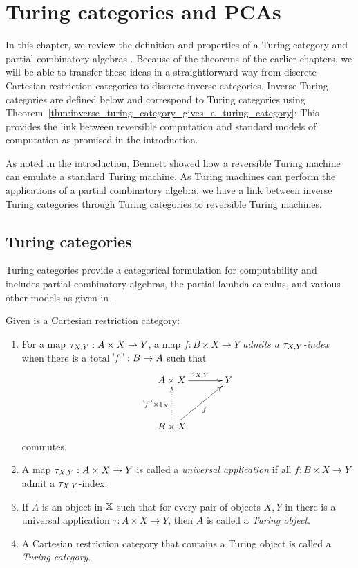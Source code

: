 \chapter{Turing categories and PCAs} %
\label{chap:turing_categories}

In this chapter, we review the definition and properties of a Turing category and partial
combinatory algebras
\cite{cockett-hostra08-intro-to-turing,cockett2010:categories-and-computability}. Because of
the theorems of the earlier chapters, we will be able to transfer these ideas in a straightforward
way from discrete Cartesian restriction categories to discrete inverse categories.  Inverse Turing
categories are defined below and correspond to Turing categories using
Theorem~\ref{thm:inverse_turing_category_gives_a_turing_category}: This  provides the link between
reversible computation and standard models of computation as promised in the introduction.

As noted in the introduction, Bennett\cite{bennett:1973reverse} showed how a reversible Turing
machine can emulate a standard Turing machine. As Turing machines can perform the applications of a
partial combinatory algebra, we have a link between inverse Turing categories through Turing
categories to reversible Turing machines.

\section{Turing categories}
\label{sec:turing_category_definitions}
Turing categories provide a categorical formulation for
computability and includes partial combinatory algebras, the partial lambda calculus, and various
other models as given in
\cite{cockett-hostra08-intro-to-turing}.

\begin{definition}\label{def:turing_category}
  Given \X is a Cartesian restriction category:
  \begin{enumerate}[{(}i{)}]
    \item For a map $\tau_{{X},{Y}}: A \times X \to Y$, a map $f:B\times X \to Y$ \emph{admits a $\tau_{{X},{Y}}$-index}
      when there is a total ${}^\ulcorner\!\!f^\urcorner:B\to A$ such that
      \[
        \xymatrix@C+10pt@R+10pt{
          A\times X \ar[r]^{\txy} & Y \\
          B\times X \ar@{.>}[u]^{\name{f}\times 1_X} \ar[ur]_f
        }
      \]
      commutes.\label{defitem:turing_admit_txy_index}
    \item A map $\tau_{{X},{Y}}: A \times X \to Y$ is called a \emph{universal application} if all
      $f:B\times X \to Y$ admit a $\tau_{{X},{Y}}$-index.\label{defitem:turing_universal_application}
    \item If $A$ is an object in $\mathbb{X}$ such that for every pair of objects $X,Y$ in \X there is
      a universal application $\tau:A\times X \to Y$, then $A$ is called a \emph{Turing object}.
    \item A Cartesian restriction category that contains a Turing object is called a
      \emph{Turing category}.
  \end{enumerate}
\end{definition}

